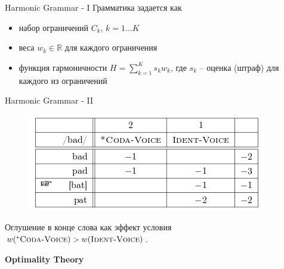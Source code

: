 \documentclass{beamer}
\begin{document}
\begin{frame}{Harmonic Grammar - I}
Грамматика задается как\\
\bigskip
\begin{itemize}
	\item набор ограничений $C_k$, $k = 1 \dots K$
	\medskip
	\item веса $w_k \in \mathbb{R}$ для каждого ограничения
	\medskip
	\item функция гармоничности $H = \sum_{k=1}^{K} s_k w_k$, где $s_k$ -- оценка (штраф) для каждого из ограничений
\end{itemize}
\end{frame}

\begin{frame}{Harmonic Grammar - II}
\begin{center}
	\begin{figure}[H]
		\includegraphics[scale=0.6]{hg_tableau1.png} 
	\end{figure}
\end{center}
\medskip
Оглушение в конце слова как эффект условия $w(^{*}\textsc{Coda-Voice}) > w(\textsc{Ident-Voice})$.
\end{frame}

\begin{frame}{}
\begin{center}
	\textbf{Optimality Theory}
\end{center}
\end{frame}
\end{document}
